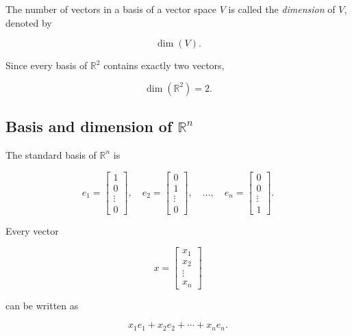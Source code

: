 \begin{definition}[Dimension]
	The number of vectors in a basis of a vector space \(V\) is called the
	\emph{dimension} of \(V\), denoted by

	\[
		\dim(V).
	\]
\end{definition}


\begin{example}
	Since every basis of \(\mathbb{R}^2\) contains exactly two vectors,

	\[
		\dim(\mathbb{R}^2)=2.
	\]
\end{example}


\subsection[Basis and dimension of Rn]{Basis and dimension of \(\mathbb{R}^n\)}

The standard basis of \(\mathbb{R}^n\) is

\begin{equation}
	e_1=
	\begin{bmatrix}
		1 \\0\\\vdots\\0
	\end{bmatrix},
	\quad
	e_2=
	\begin{bmatrix}
		0 \\1\\\vdots\\0
	\end{bmatrix},
	\quad
	\dots,
	\quad
	e_n=
	\begin{bmatrix}
		0 \\0\\\vdots\\1
	\end{bmatrix}.
	\label{eq:basis-and-dimension-of-r-23}
\end{equation}

Every vector

\begin{equation}
	x=
	\begin{bmatrix}
		x_1    \\
		x_2    \\
		\vdots \\
		x_n
	\end{bmatrix}
	\label{eq:basis-and-dimension-of-r-24}
\end{equation}

can be written as

\begin{equation}
	x_1e_1+x_2e_2+\cdots+x_ne_n.
	\label{eq:basis-and-dimension-of-r-25}
\end{equation}

